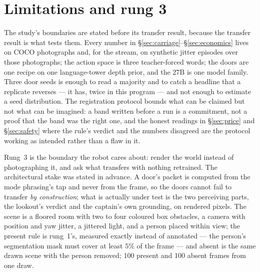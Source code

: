 \documentclass[11pt]{article}
\begin{document}
\section{Limitations and rung 3}\label{sec:limits}

The study's boundaries are stated before its transfer result, because
the transfer result is what tests them. Every number in
\S\ref{sec:carriage}--\S\ref{sec:economics} lives on COCO photographs
and, for the stream, on synthetic jitter episodes over those
photographs; the action space is three teacher-forced words; the doors
are one recipe on one language-tower depth prior, and the 27B is one
model family. Three door seeds is enough to read a majority and to
catch a headline that a replicate reverses --- it has, twice in this
program --- and not enough to estimate a seed distribution. The
registration protocol bounds what can be claimed but not what can be
imagined: a band written before a run is a commitment, not a proof
that the band was the right one, and the honest readings in
\S\ref{sec:price} and \S\ref{sec:safety} where the rule's verdict and
the numbers disagreed are the protocol working as intended rather than
a flaw in it.

Rung~3 is the boundary the robot cares about: render the world instead
of photographing it, and ask what transfers with nothing retrained. The
architectural stake was stated in advance. A door's packet is computed
from the mode phrasing's tap and never from the frame, so the doors
cannot fail to transfer \emph{by construction}; what is actually under
test is the two perceiving parts, the lookout's verdict and the
captain's own grounding, on rendered pixels. The scene is a floored
room with two to four coloured box obstacles, a camera with position
and yaw jitter, a jittered light, and a person placed within view; the
present rule is rung~1's, measured exactly instead of annotated ---
the person's segmentation mask must cover at least $5\%$ of the frame
--- and absent is the same drawn scene with the person removed; 100
present and 100 absent frames from one draw.
\end{document}
